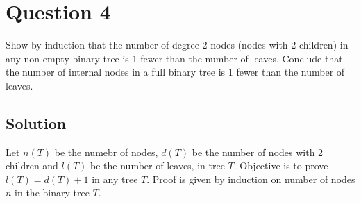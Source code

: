 
\section*{Question 4}

Show by induction that the number of degree-2 nodes (nodes with 2 children) in any non-empty binary tree is 1 fewer than the number of leaves.
Conclude that the number of internal nodes in a full binary tree is 1 fewer than the number of leaves.

\subsection*{Solution}

Let $n(T)$ be the numebr of nodes, $d(T)$ be the number of nodes with 2 children and $l(T)$ be the number of leaves, in tree $T$.
Objective is to prove $l(T) = d(T) + 1$ in any tree $T$.
Proof is given by induction on number of nodes $n$ in the binary tree $T$.

